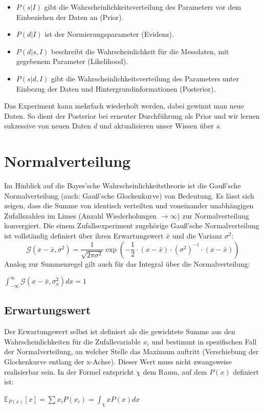 \documentclass[]{dsadokumentation}
\begin{document}
\begin{itemize}
 \item $P(s|I)$ gibt die Wahrscheinlichkeitsverteilung des Parameters vor dem Einbeziehen der Daten an (Prior).
 \item $P(d|I)$ ist der Normierungsparameter (Evidenz).
 \item $P(d|s,I)$ beschreibt die Wahrscheinlichkeit für die Messdaten, mit gegebenem Parameter (Likelihood).
 \item $P(s|d,I)$ gibt die Wahrscheinlichkeitsverteilung des Parameters unter Einbezug der Daten und Hintergrundinformationen (Posterior).
\end{itemize}

Das Experiment kann mehrfach wiederholt werden, dabei gewinnt man neue Daten. So dient der Posterior bei erneuter Durchführung als Prior und wir lernen sukzessive von neuen Daten $d$ und aktualisieren unser Wissen über $s$.

\section{Normalverteilung}

Im Hinblick auf die Bayes'sche Wahrscheinlichkeitstheorie ist die Gauß'sche Normalverteilung (auch: Gauß'sche Glockenkurve) von Bedeutung.
Es lässt sich zeigen, dass die Summe von identisch verteilten und voneinander unabhängigen Zufallszahlen im Limes (Anzahl Wiederholungen $\rightarrow \infty$) zur Normalverteilung konvergiert.
Die einem Zufallsexperiment zugehörige Gauß'sche Normalverteilung ist vollständig definiert über ihren Erwartungswert $\bar{x}$ und die Varianz $\sigma^{2}$:
\[ \mathcal{G} (x - \bar{x}, \sigma^{2}) = \displaystyle\frac{1}{\sqrt{2 \pi \sigma^{2}}} \exp \left(- \displaystyle\frac{1}{2} \cdot (x - \bar{x}) \cdot (\sigma^{2})^{-1} \cdot (x - \bar{x}) \right) \]
Analog zur Summenregel gilt auch für das Integral über die Normalverteilung:
\begin{center} $\int_{- \infty}^{\infty} \mathcal{G} (x - \bar{x}, \sigma _x ^{2}) dx = 1$ \end{center}

\subsection{Erwartungswert}
Der Erwartungswert selbst ist definiert als die gewichtete Summe aus den Wahrscheinlichkeiten für die Zufallsvariable $x _i$ und bestimmt in spezifischen Fall der Normalverteilung, an welcher Stelle das Maximum auftritt (Verschiebung der Glockenkurve entlang der x-Achse). Dieser Wert muss nicht zwangsweise realisierbar sein. In der Formel entspricht $\chi$ dem Raum, auf dem $P(x)$ definiert ist:
\begin{center} $\mathbb{E} _{P(x)} [x] = \sum x _i P(x _i) = \int_{\chi} x P(x) dx$ \end{center}
\end{document}
